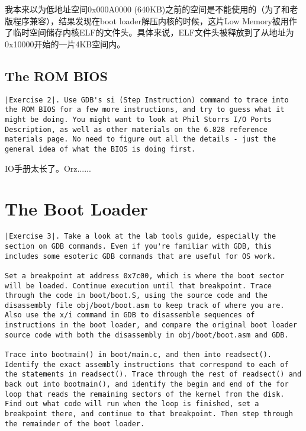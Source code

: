 \documentclass{article}
\begin{document}
\begin{CJK*}{UTF8}{gkai}
我本来以为低地址空间0x000A0000 (640KB)之前的空间是不能使用的（为了和老版程序兼容），结果发现在boot loader解压内核的时候，这片Low Memory被用作了临时空间储存内核ELF的文件头。具体来说，ELF文件头被释放到了从地址为0x10000开始的一片4KB空间内。

\subsection{The ROM BIOS}

\begin{lstlisting}[style=exercise]
|Exercise 2|. Use GDB's si (Step Instruction) command to trace into the ROM BIOS for a few more instructions, and try to guess what it might be doing. You might want to look at Phil Storrs I/O Ports Description, as well as other materials on the 6.828 reference materials page. No need to figure out all the details - just the general idea of what the BIOS is doing first.
\end{lstlisting}

IO手册太长了。Orz......

\section{The Boot Loader}

\begin{lstlisting}[style=exercise]
|Exercise 3|. Take a look at the lab tools guide, especially the section on GDB commands. Even if you're familiar with GDB, this includes some esoteric GDB commands that are useful for OS work.

Set a breakpoint at address 0x7c00, which is where the boot sector will be loaded. Continue execution until that breakpoint. Trace through the code in boot/boot.S, using the source code and the disassembly file obj/boot/boot.asm to keep track of where you are. Also use the x/i command in GDB to disassemble sequences of instructions in the boot loader, and compare the original boot loader source code with both the disassembly in obj/boot/boot.asm and GDB.

Trace into bootmain() in boot/main.c, and then into readsect(). Identify the exact assembly instructions that correspond to each of the statements in readsect(). Trace through the rest of readsect() and back out into bootmain(), and identify the begin and end of the for loop that reads the remaining sectors of the kernel from the disk. Find out what code will run when the loop is finished, set a breakpoint there, and continue to that breakpoint. Then step through the remainder of the boot loader.
\end{lstlisting}


\end{CJK*}
\end{document}
